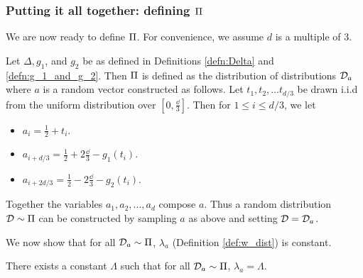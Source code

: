 \subsubsection{Putting it all together: defining $\Pi$}\label{subsubsec:finalA}

We are now ready to define $\Pi$. For convenience, we assume $d$ is a multiple of $3$.
\begin{defn}\label{defn:A}
Let $\Delta, g_1$, and $g_2$ be as defined in Definitions \ref{defn:Delta} and \ref{defn:g_1_and_g_2}. Then $\Pi$ is defined as the distribution of distributions ${\mathcal D}_a$ where $a$ is a random vector constructed as follows. Let $t_1, t_2, \dots t_{d/3}$ be drawn i.i.d from the uniform distribution over $[0, \frac{\dd}{3}]$. Then for $1 \leq i \leq d/3$, we let
	\begin{itemize}
		\item $a_i = \frac{1}{2} + t_i$.
		\item $a_{i+d/3} = \frac{1}{2} + 2\frac{\dd}{3} - g_1(t_i)$.
		\item $a_{i + 2d/3} = \frac{1}{2} - 2\frac{\dd}{3} - g_2(t_i).$
	\end{itemize}
Together the variables $a_1, a_2, \dots, a_d$ compose $a$. Thus a random distribution ${\mathcal D} \sim \Pi$ can be constructed by sampling $a$ as above and setting ${\mathcal D} = {\mathcal D}_a$.
\end{defn}

We now show that for all ${\mathcal D}_a \sim \Pi$, $\lambda_a$ (Definition \ref{def:w_dist}) is constant.

\begin{lem}\label{lem:cons_lambda}
There exists a constant $\Lambda$ such that for all ${\mathcal D}_a \sim \Pi$, $\lambda_a = \Lambda$. 
\end{lem}

